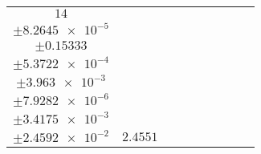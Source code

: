 \documentclass[8pt]{article}
\begin{document}
\begin{longtable}[l]{c c c c c c c c c}
$\num{14}$ & \begin{tabular}[c]{@{}c@{}}$\num{3.0957e-2}$ \\ $\pm\num{8.2645e-5}$\end{tabular} & \begin{tabular}[c]{@{}c@{}}$\num{0.20936}$ \\ $\pm\num{0.15333}$\end{tabular} & \begin{tabular}[c]{@{}c@{}}$\num{15.889}$ \\ $\pm\num{5.3722e-4}$\end{tabular} & \begin{tabular}[c]{@{}c@{}}$\num{1.4543e+3}$ \\ $\pm\num{3.963e-3}$\end{tabular} & \begin{tabular}[c]{@{}c@{}}$\num{2.9094}$ \\ $\pm\num{7.9282e-6}$\end{tabular} & \begin{tabular}[c]{@{}c@{}}$\num{1.1918}$ \\ $\pm\num{3.4175e-3}$\end{tabular} & \begin{tabular}[c]{@{}c@{}}$\num{4.1741}$ \\ $\pm\num{2.4592e-2}$\end{tabular} & $\num{2.4551}$\\
\bottomrule
\end{longtable}
\end{document}
